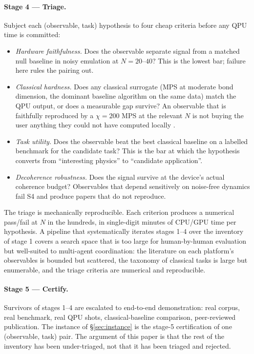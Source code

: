 \documentclass[10pt]{article}
\begin{document}
\paragraph{Stage 4 --- Triage.}
Subject each (observable, task) hypothesis to four cheap criteria before any QPU time is committed:
\begin{itemize}[leftmargin=2em, itemsep=0.2em, topsep=0.3em]
\item[\textbf{S1}] \emph{Hardware faithfulness.} Does the observable separate signal from a matched null baseline in noisy emulation at $N = 20$--$40$? This is the lowest bar; failure here rules the pairing out.
\item[\textbf{S2}] \emph{Classical hardness.} Does any classical surrogate (MPS at moderate bond dimension, the dominant baseline algorithm on the same data) match the QPU output, or does a measurable gap survive? An observable that is faithfully reproduced by a $\chi = 200$ MPS at the relevant $N$ is not buying the user anything they could not have computed locally \cite{vovrosh2025crossover,vovrosh2025quench2d}.
\item[\textbf{S3}] \emph{Task utility.} Does the observable beat the best classical baseline on a labelled benchmark for the candidate task? This is the bar at which the hypothesis converts from ``interesting physics'' to ``candidate application''.
\item[\textbf{S4}] \emph{Decoherence robustness.} Does the signal survive at the device's actual coherence budget? Observables that depend sensitively on noise-free dynamics fail S4 and produce papers that do not reproduce.
\end{itemize}

The triage is mechanically reproducible. Each criterion produces a numerical pass/fail at $N$ in the hundreds, in single-digit minutes of CPU/GPU time per hypothesis. A pipeline that systematically iterates stages 1--4 over the inventory of stage 1 covers a search space that is too large for human-by-human evaluation but well-suited to multi-agent coordination: the literature on each platform's observables is bounded but scattered, the taxonomy of classical tasks is large but enumerable, and the triage criteria are numerical and reproducible.

\paragraph{Stage 5 --- Certify.}
Survivors of stages 1--4 are escalated to end-to-end demonstration: real corpus, real benchmark, real QPU shots, classical-baseline comparison, peer-reviewed publication. The instance of \S\ref{sec:instance} is the stage-5 certification of one (observable, task) pair. The argument of this paper is that the rest of the inventory has been under-triaged, not that it has been triaged and rejected.
\end{document}
